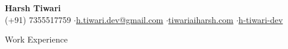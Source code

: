 \documentclass[10pt,letterpaper]{article}
\newcommand{\titlePersonalInfo}[6]{
  \begin{center}{\huge \textbf{#1}}
  \\#2\hspace{0.4em}
  $\cdot$\hspace{0.4em}\href{mailto:#3}{#3}\hspace{0.4em}
  $\cdot$\hspace{0.4em}\href{http://#4}{#4}\hspace{0.4em}
  $\cdot$\hspace{0.4em}\href{http://github.com/#5}{#5}\hspace{0.4em}
  \end{center}
}
\newcommand{\sectionTitle}[1]{
  \hrule
  \vspace{-1.0em} 
  \subsection*{\uppercase{\textbf{#1}} }
  \vspace{-0.3em}
    \hrule
    \vspace{0.3em}  
}
\newcommand{\sectionTitleWithWeb}[1]{
  \hrule
  \vspace{-1.0em} 
  \subsection*{\uppercase{\textbf{#1}} \hfill }
  \vspace{-0.em}
    \hrule
    \vspace{0.3em}  
}
\begin{document}
  
  \titlePersonalInfo{Harsh Tiwari}{(+91) 7355517759}{h.tiwari.dev@gmail.com}{tiwariaiharsh.com}{h-tiwari-dev}

  
  
  \sectionTitleWithWeb{Work Experience}
  \vspace{-1.1em}
\end{document}
